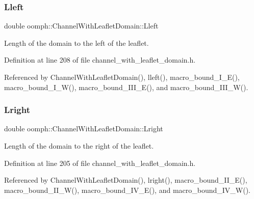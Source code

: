 \subsubsection{\texorpdfstring{Lleft}{Lleft}}
{\footnotesize\ttfamily double oomph\+::\+Channel\+With\+Leaflet\+Domain\+::\+Lleft\hspace{0.3cm}{\ttfamily [protected]}}



Length of the domain to the left of the leaflet. 



Definition at line 208 of file channel\+\_\+with\+\_\+leaflet\+\_\+domain.\+h.



Referenced by Channel\+With\+Leaflet\+Domain(), lleft(), macro\+\_\+bound\+\_\+\+I\+\_\+\+E(), macro\+\_\+bound\+\_\+\+I\+\_\+\+W(), macro\+\_\+bound\+\_\+\+I\+I\+I\+\_\+\+E(), and macro\+\_\+bound\+\_\+\+I\+I\+I\+\_\+\+W().

\mbox{\label{classoomph_1_1ChannelWithLeafletDomain_a6c1a799bbedc5f0ff08f38088eaedc68}} 
\subsubsection{\texorpdfstring{Lright}{Lright}}
{\footnotesize\ttfamily double oomph\+::\+Channel\+With\+Leaflet\+Domain\+::\+Lright\hspace{0.3cm}{\ttfamily [protected]}}



Length of the domain to the right of the leaflet. 



Definition at line 205 of file channel\+\_\+with\+\_\+leaflet\+\_\+domain.\+h.



Referenced by Channel\+With\+Leaflet\+Domain(), lright(), macro\+\_\+bound\+\_\+\+I\+I\+\_\+\+E(), macro\+\_\+bound\+\_\+\+I\+I\+\_\+\+W(), macro\+\_\+bound\+\_\+\+I\+V\+\_\+\+E(), and macro\+\_\+bound\+\_\+\+I\+V\+\_\+\+W().

\mbox{\label{classoomph_1_1ChannelWithLeafletDomain_ad0abd8837f9f0924b801d2fb78c69532}} 
